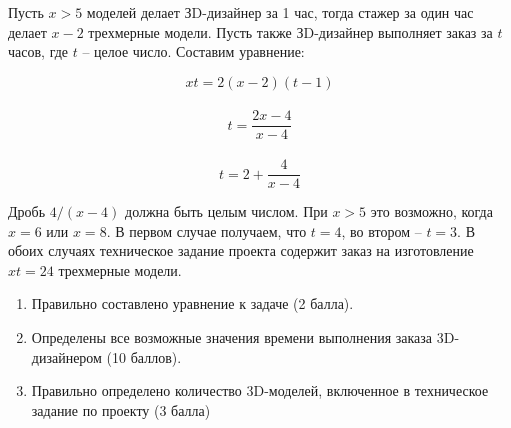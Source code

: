 \solutionSection

Пусть $x>5$ моделей делает ЗD-дизайнер за 1 час, тогда стажер за один час делает $x-2$ трехмерные модели. Пусть также ЗD-дизайнер выполняет заказ за $t$ часов, где $t$ – целое число. Составим уравнение: 

\begin{displaymath}
xt=2(x-2)(t-1)
\end{displaymath}\\
\begin{displaymath}
t=\frac{2x-4}{x-4}
\end{displaymath}\\
\begin{displaymath}
t= 2 + \frac{4}{x-4}
\end{displaymath}

Дробь $4/(x-4)$ должна быть целым числом. При $x>5$ это возможно, когда $x=6$ или $x=8$. В первом случае получаем, что $t=4$, во втором – $t=3$. В обоих случаях техническое задание проекта содержит заказ на изготовление $xt=24$ трехмерные модели.


\markSection

\begin{enumerate}
    \item Правильно составлено уравнение к задаче (2 балла). 
    \item Определены все возможные значения времени выполнения заказа 3D-дизайнером (10 баллов). 
    \item Правильно определено количество 3D-моделей, включенное в техническое задание по проекту (3 балла)
\end{enumerate}